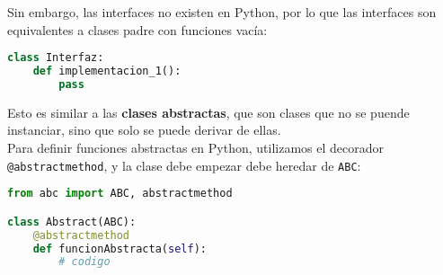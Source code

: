\documentclass{./Programacion.tex}
\begin{document}
Sin embargo, las interfaces no existen en Python, por lo que las interfaces son equivalentes a clases padre con funciones vacía:
\begin{lstlisting}[language=python]
class Interfaz:
	def implementacion_1():
		pass
\end{lstlisting}
Esto es similar a las \textbf{clases abstractas}, que son clases que no se puende instanciar, sino que solo se puede derivar de ellas.\\
Para definir funciones abstractas en Python, utilizamos el decorador \verb|@abstractmethod|, y la clase debe empezar debe heredar de \verb|ABC|:
\begin{lstlisting}[language=python]
from abc import ABC, abstractmethod

class Abstract(ABC):
	@abstractmethod
	def funcionAbstracta(self):
		# codigo
\end{lstlisting}
\end{document}
